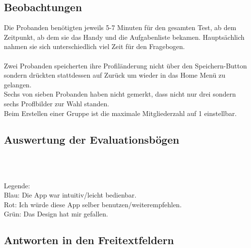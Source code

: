 \documentclass[a4paper]{scrreprt}
\begin{document}
\subsection*{Beobachtungen}
Die Probanden benötigten jeweils 5-7 Minuten für den gesamten Test, ab dem Zeitpunkt, ab dem sie das Handy und die Aufgabenliste bekamen. Hauptsächlich nahmen sie sich unterschiedlich viel Zeit für den Fragebogen.\\
\ \\
Zwei Probanden speicherten ihre Profiländerung nicht über den Speichern-Button sondern drückten stattdessen auf Zurück  um wieder in das Home Menü zu gelangen.
\ \\
Sechs von sieben Probanden haben nicht gemerkt, dass nicht nur drei sondern sechs Proflbilder zur Wahl standen.
\ \\
Beim Erstellen einer Gruppe ist die maximale Mitgliederzahl auf 1 einstellbar. 

\subsection*{Auswertung der Evaluationsbögen}
\ \\
\ \\
Legende: \ \\
Blau: Die App war intuitiv/leicht bedienbar. \\
Rot:  Ich würde diese App selber benutzen/weiterempfehlen. \\
Grün: Das Design hat mir gefallen.

\newpage
\subsection*{Antworten in den Freitextfeldern}
\end{document}
